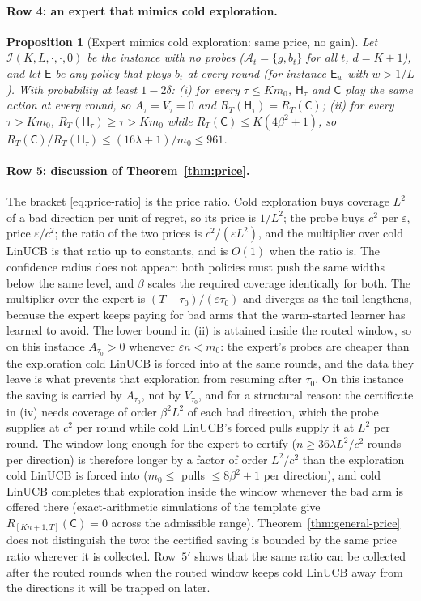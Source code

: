 \documentclass{article}
\newtheorem{proposition}{Proposition}
\theoremstyle{definition}
\theoremstyle{remark}
\newcommand{\eps}{\varepsilon}
\theoremstyle{remark}
\newcommand{\Cold}{\mathsf{C}}
\newcommand{\Exp}{\mathsf{E}}
\newcommand{\Hyb}{\mathsf{H}}
\begin{document}
\paragraph{Row 4: an expert that mimics cold exploration.}
\begin{proposition}[Expert mimics cold exploration: same price, no gain]
\label{prop:cat-mimic}
Let $\mathcal I(K,L,\cdot,\cdot,0)$ be the instance with no probes
($\mathcal A_t=\{g,b_t\}$ for all $t$, $d=K+1$), and let $\Exp$ be any policy
that plays $b_t$ at every round (for instance $\Exp_w$ with $w>1/L$). With
probability at least $1-2\delta$: (i) for every $\tau\le Km_0$,
$\Hyb_\tau$ and $\Cold$ play the same action at every round, so
$A_\tau=V_\tau=0$ and $R_T(\Hyb_\tau)=R_T(\Cold)$; (ii) for every
$\tau>Km_0$, $R_T(\Hyb_\tau)\ge\tau>Km_0$ while $R_T(\Cold)\le K(4\beta^2+1)$,
so $R_T(\Cold)/R_T(\Hyb_\tau)\le(16\lambda+1)/m_0\le961$.
\end{proposition}

\paragraph{Row 5: discussion of Theorem~\ref{thm:price}.}
The bracket \eqref{eq:price-ratio} is the price ratio. Cold exploration buys
coverage $L^2$ of a bad direction per unit of regret, so its price is $1/L^2$;
the probe buys $c^2$ per $\eps$, price $\eps/c^2$; the ratio of the two prices
is $c^2/(\eps L^2)$, and the multiplier over cold LinUCB is that ratio up to
constants, and is $O(1)$ when the ratio is. The confidence radius does not
appear: both policies must push the same widths below the same level, and
$\beta$ scales the required coverage identically for both. The multiplier
over the expert is $(T-\tau_0)/(\eps\tau_0)$ and diverges as the tail
lengthens, because the expert keeps paying for bad arms that the warm-started
learner has learned to avoid. The lower bound in (ii) is attained inside the
routed window, so on this instance $A_{\tau_0}>0$ whenever $\eps n<m_0$: the
expert's probes are cheaper than the exploration cold LinUCB is forced into
at the same rounds, and the data they leave is what prevents that exploration
from resuming after $\tau_0$. On this instance the saving is carried by
$A_{\tau_0}$, not by $V_{\tau_0}$, and for a structural reason: the
certificate in (iv) needs coverage of order $\beta^2L^2$ of each bad
direction, which the probe supplies at $c^2$ per round while cold LinUCB's
forced pulls supply it at $L^2$ per round. The window long enough for the
expert to certify ($n\ge36\lambda L^2/c^2$ rounds per direction) is therefore
longer by a factor of order $L^2/c^2$ than the exploration cold LinUCB is
forced into ($m_0\le$ pulls $\le 8\beta^2+1$ per direction), and cold LinUCB
completes that exploration inside the window whenever the bad arm is offered
there (exact-arithmetic simulations of the template give
$R_{[Kn+1,T]}(\Cold)=0$ across the admissible range). Theorem~\ref{thm:general-price}
does not distinguish the two: the certified saving is bounded by the
same price ratio wherever it is collected. Row~$5'$ shows that the same ratio
can be collected after the routed rounds when the routed window keeps cold
LinUCB away from the directions it will be trapped on later.
\end{document}
